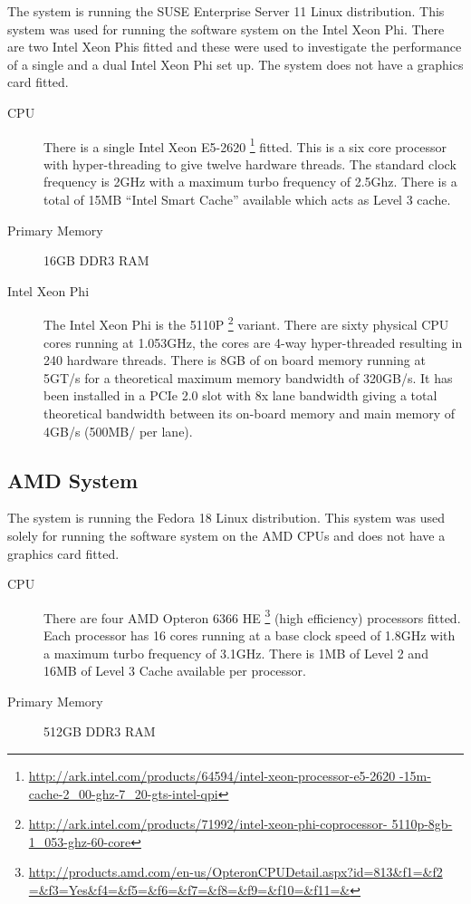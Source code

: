 The system is running the SUSE Enterprise Server 11 Linux distribution. This
system was used for running the software system on the Intel Xeon Phi. There are
two Intel Xeon Phis fitted and these were used to investigate the performance of
a single and a dual Intel Xeon Phi set up. The system does not have a graphics
card fitted.

\begin{description}

\item[CPU] There is a single Intel Xeon E5-2620
\footnote{\url{http://ark.intel.com/products/64594/intel-xeon-processor-e5-2620
-15m-cache-2_00-ghz-7_20-gts-intel-qpi}} fitted. This is a six core processor
with hyper-threading to give twelve hardware threads. The standard clock
frequency is 2GHz with a maximum turbo frequency of 2.5Ghz. There is a total of
15MB ``Intel Smart Cache'' available which acts as Level 3 cache.

\item[Primary Memory] 16GB DDR3 RAM

\item[Intel Xeon Phi] The Intel Xeon Phi is the 5110P
\footnote{\url{http://ark.intel.com/products/71992/intel-xeon-phi-coprocessor-
5110p-8gb-1_053-ghz-60-core}} variant. There are sixty physical CPU cores
running at 1.053GHz, the cores are 4-way hyper-threaded resulting in 240
hardware threads. There is 8GB of on board memory running at 5GT/s for a
theoretical maximum memory bandwidth of 320GB/s. It has been installed in a PCIe
2.0 slot with 8x lane bandwidth giving a total theoretical bandwidth between
its on-board memory and main memory of 4GB/s (500MB/ per lane).

\end{description}

\subsection{AMD System}

The system is running the Fedora 18 Linux distribution. This system was used
solely for running the software system on the AMD CPUs and does not have a
graphics card fitted.

\begin{description}

\item[CPU] There are four AMD Opteron 6366 HE
\footnote{\url{http://products.amd.com/en-us/OpteronCPUDetail.aspx?id=813&f1=&f2
=&f3=Yes&f4=&f5=&f6=&f7=&f8=&f9=&f10=&f11=&}} (high efficiency) processors
fitted. Each processor has 16 cores running at a base clock speed of 1.8GHz with
a maximum turbo frequency of 3.1GHz. There is 1MB of Level 2 and 16MB of Level 3
Cache available per processor.

\item[Primary Memory] 512GB DDR3 RAM

\end{description}

